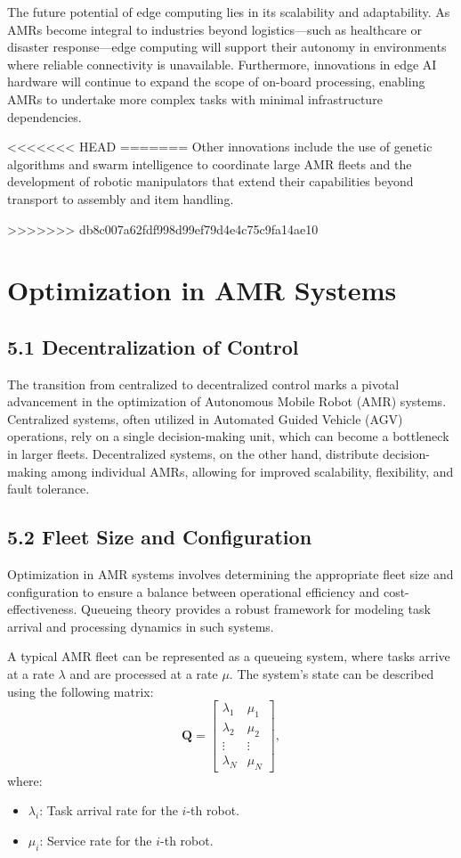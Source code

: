 \documentclass[conference]{IEEEtran}
\begin{document}
The future potential of edge computing lies in its scalability and adaptability. As AMRs become integral to industries beyond logistics—such as healthcare or disaster response—edge computing will support their autonomy in environments where reliable connectivity is unavailable. Furthermore, innovations in edge AI hardware will continue to expand the scope of on-board processing, enabling AMRs to undertake more complex tasks with minimal infrastructure dependencies.

<<<<<<< HEAD
=======
Other innovations include the use of genetic algorithms and swarm intelligence to coordinate large AMR fleets and the development of robotic manipulators that extend their capabilities beyond transport to assembly and item handling.


>>>>>>> db8c007a62fdf998d99ef79d4e4c75c9fa14ae10
\section{Optimization in AMR Systems}

\subsection*{\textbf{5.1 Decentralization of Control}}
The transition from centralized to decentralized control marks a pivotal advancement in the optimization of Autonomous Mobile Robot (AMR) systems. Centralized systems, often utilized in Automated Guided Vehicle (AGV) operations, rely on a single decision-making unit, which can become a bottleneck in larger fleets. Decentralized systems, on the other hand, distribute decision-making among individual AMRs, allowing for improved scalability, flexibility, and fault tolerance.

\subsection*{\textbf{5.2 Fleet Size and Configuration}}
Optimization in AMR systems involves determining the appropriate fleet size and configuration to ensure a balance between operational efficiency and cost-effectiveness. Queueing theory provides a robust framework for modeling task arrival and processing dynamics in such systems.

A typical AMR fleet can be represented as a queueing system, where tasks arrive at a rate \( \lambda \) and are processed at a rate \( \mu \). The system's state can be described using the following matrix:
\[
\mathbf{Q} = 
\begin{bmatrix}
\lambda_1 & \mu_1 \\
\lambda_2 & \mu_2 \\
\vdots & \vdots \\
\lambda_N & \mu_N
\end{bmatrix},
\]
where:
\\
\begin{itemize}
    \item \( \lambda_i \): Task arrival rate for the \( i \)-th robot.
    \item \( \mu_i \): Service rate for the \( i \)-th robot.
\end{itemize}
\end{document}
